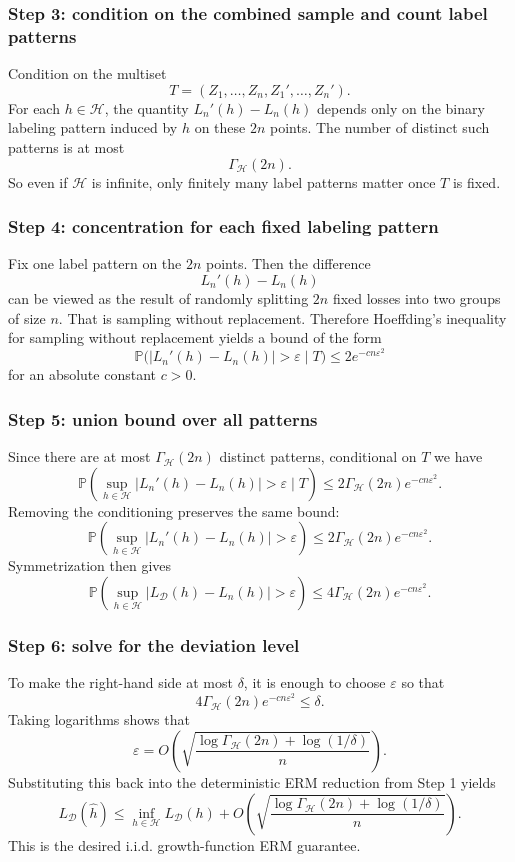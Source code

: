 \documentclass[11pt]{article}
\newcommand{\Pbb}{\mathbb{P}}
\newcommand{\calD}{\mathcal{D}}
\newcommand{\calH}{\mathcal{H}}
\newcommand{\GammaH}{\Gamma_{\mathcal{H}}}
\newcommand{\eps}{\varepsilon}
\begin{document}
\begin{solutionbox}
\subsubsection*{Step 3: condition on the combined sample and count label patterns}
Condition on the multiset
\[
T=(Z_1,\dots,Z_n,Z_1',\dots,Z_n').
\]
For each $h\in\calH$, the quantity $L_n'(h)-L_n(h)$ depends only on the binary labeling pattern induced by $h$ on these $2n$ points. The number of distinct such patterns is at most
\[
\GammaH(2n).
\]
So even if $\calH$ is infinite, only finitely many label patterns matter once $T$ is fixed.

\subsubsection*{Step 4: concentration for each fixed labeling pattern}
Fix one label pattern on the $2n$ points. Then the difference
\[
L_n'(h)-L_n(h)
\]
can be viewed as the result of randomly splitting $2n$ fixed losses into two groups of size $n$. That is sampling without replacement. Therefore Hoeffding's inequality for sampling without replacement yields a bound of the form
\[
\Pbb\bigl(|L_n'(h)-L_n(h)|>\eps\mid T\bigr)
\le
2e^{-cn\eps^2}
\]
for an absolute constant $c>0$.

\subsubsection*{Step 5: union bound over all patterns}
Since there are at most $\GammaH(2n)$ distinct patterns, conditional on $T$ we have
\[
\Pbb\left(\sup_{h\in\calH}|L_n'(h)-L_n(h)|>\eps\mid T\right)
\le
2\GammaH(2n)e^{-cn\eps^2}.
\]
Removing the conditioning preserves the same bound:
\[
\Pbb\left(\sup_{h\in\calH}|L_n'(h)-L_n(h)|>\eps\right)
\le
2\GammaH(2n)e^{-cn\eps^2}.
\]
Symmetrization then gives
\[
\Pbb\left(\sup_{h\in\calH}|L_{\calD}(h)-L_n(h)|>\eps\right)
\le
4\GammaH(2n)e^{-cn\eps^2}.
\]

\subsubsection*{Step 6: solve for the deviation level}
To make the right-hand side at most $\delta$, it is enough to choose $\eps$ so that
\[
4\GammaH(2n)e^{-cn\eps^2}\le \delta.
\]
Taking logarithms shows that
\[
\eps
=
O\!\left(\sqrt{\frac{\log\GammaH(2n)+\log(1/\delta)}{n}}\right).
\]
Substituting this back into the deterministic ERM reduction from Step 1 yields
\[
L_{\calD}(\hat h)
\le
\inf_{h\in\calH}L_{\calD}(h)
+
O\!\left(\sqrt{\frac{\log\GammaH(2n)+\log(1/\delta)}{n}}\right).
\]
This is the desired i.i.d. growth-function ERM guarantee.
\end{solutionbox}
\end{document}
